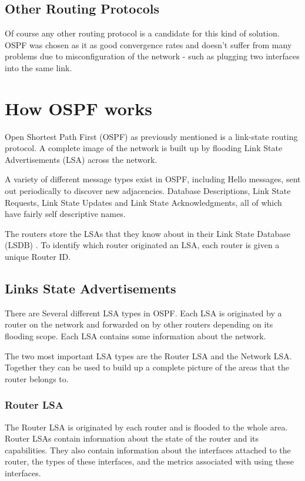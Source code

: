 \documentclass[12pt]{report}
\begin{document}
\subsection{Other Routing Protocols}
Of course any other routing protocol is a candidate for this kind of solution.
OSPF was chosen as it as good convergence rates and doesn't suffer from many
problems due to misconfiguration of the network - such as plugging two
interfaces into the same link.

\section{How OSPF works}
 Open Shortest Path First
(OSPF) as previously mentioned is a link-state routing protocol. A complete
image of the network is built up by flooding Link State Advertisements (LSA)
across the network. 

A variety of different message types exist in OSPF, including Hello messages,
sent out periodically to discover new adjacencies. Database Descriptions, Link
State Requests, Link State Updates and Link State Acknowledgments, all of which
have fairly self descriptive names.

The routers store the LSAs that they know about in their Link State Database
(LSDB) .  To identify which router
originated an LSA, each router is given a unique Router ID.

\subsection{Links State Advertisements}
There are Several different LSA types in OSPF\@. Each LSA is originated by
a router on the network and forwarded on by other routers depending on its
flooding scope. Each LSA contains some information about the network. 
 
The two most important LSA types are the Router LSA and the Network LSA\@.
Together they can be used to build up a complete picture of the areas that the
router belongs to. 

\subsubsection{Router LSA}
The Router LSA is originated by each router and is flooded to the whole area.
Router LSAs contain information about the state of the router and its
capabilities. They also contain information about the interfaces attached to
the router, the types of these interfaces, and the metrics associated with
using these interfaces. 
\end{document}
